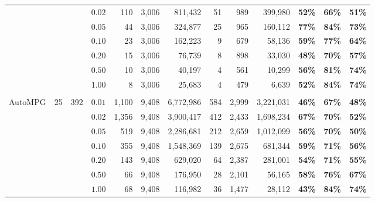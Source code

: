 \documentclass[mnsc,nonblindrev]{informs3} %
\begin{document}
\begin{center}
\begin{table}[h!]
\begin{tabular}{l r r r|r r r | r r r  | r r r }
		&&&$0.02$&110&3,006&811,432&51&989&399,980&\textbf{52\%}&\textbf{66\%}&\textbf{51\%}\\
		&&&$0.05$&44&3,006&324,877&25&965&160,112&\textbf{77\%}&\textbf{84\%}&\textbf{73\%}\\
		&&&$0.10$&23&3,006&162,223&9&679&58,136&\textbf{59\%}&\textbf{77\%}&\textbf{64\%}\\
		&&&$0.20$&15&3,006&76,739&8&898&33,030&\textbf{48\%}&\textbf{70\%}&\textbf{57\%}\\
		&&&$0.50$&10&3,006&40,197&4&561&10,299&\textbf{56\%}&\textbf{81\%}&\textbf{74\%}\\
		&&&$1.00$&8&3,006&25,683&4&479&6,639&\textbf{52\%}&\textbf{84\%}&\textbf{74\%}\\
			&&&&&&&&&&&&\\
		\multirow{7}{*}{AutoMPG}&\multirow{7}{*}{25}&\multirow{7}{*}{392}&
		$0.01$&1,100&9,408&6,772,986&584&2,999&3,221,031&\textbf{46\%}&\textbf{67\%}&\textbf{48\%}\\
		&&&$0.02$&1,356&9,408&3,900,417&412&2,433&1,698,234&\textbf{67\%}&\textbf{70\%}&\textbf{52\%}\\
		&&&$0.05$&519&9,408&2,286,681&212&2,659&1,012,099&\textbf{56\%}&\textbf{70\%}&\textbf{50\%}\\
		&&&$0.10$&355&9,408&1,548,369&139&2,675&681,344&\textbf{59\%}&\textbf{71\%}&\textbf{56\%}\\
		&&&$0.20$&143&9,408&629,020&64&2,387&281,001&\textbf{54\%}&\textbf{71\%}&\textbf{55\%}\\
		&&&$0.50$&66&9,408&176,950&28&2,101&56,165&\textbf{58\%}&\textbf{76\%}&\textbf{67\%}\\
		&&&$1.00$&68&9,408&116,982&36&1,477&28,112&\textbf{43\%}&\textbf{84\%}&\textbf{74\%}\\
		\hline
	\end{tabular}
\end{table}
\end{center}
\end{document}
